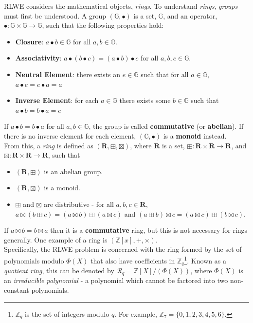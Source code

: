 RLWE considers the mathematical objects, \textit{rings}. To understand \textit{rings}, \textit{groups} must first be understood. A group $(\mathbb{G}, \bullet)$ is a set, $\mathbb{G}$, and an operator, $\bullet: \mathbb{G} \times \mathbb{G} \rightarrow \mathbb{G}$, such that the following properties hold:
\begin{itemize}
    \item \textbf{Closure}: $a \bullet b \in \mathbb{G}$ for all $a,b \in \mathbb{G}$.
    \item \textbf{Associativity}: $a \bullet (b \bullet c) = (a \bullet b) \bullet c$ for all $a, b, c \in \mathbb{G}$.
    \item \textbf{Neutral Element}: there exists an $e \in \mathbb{G}$ such that for all $a \in \mathbb{G}$, $a \bullet e = e \bullet a = a$
    \item \textbf{Inverse Element}: for each $a \in \mathbb{G}$ there exists some $b \in \mathbb{G}$ such that $a \bullet b = b \bullet a = e$
\end{itemize}
If $a \bullet b = b \bullet a$ for all $a, b \in \mathbb{G}$, the group is called \textbf{commutative} (or \textbf{abelian}). If there is no inverse element for each element, $(\mathbb{G}, \bullet)$ is a \textbf{monoid} instead.
\smallskip \\ \indent
From this, a \textit{ring} is defined as $(\textbf{R}, \boxplus, \boxtimes)$, where $\textbf{R}$ is a set, $\boxplus: \textbf{R} \times \textbf{R} \rightarrow \textbf{R}$, and $\boxtimes: \textbf{R} \times \textbf{R} \rightarrow \textbf{R}$, such that
\begin{itemize}
    \item $(\textbf{R}, \boxplus)$ is an abelian group.
    \item $(\textbf{R}, \boxtimes)$ is a monoid.
    \item $\boxplus$ and $\boxtimes$ are distributive - for all $a, b, c \in \textbf{R}$, $a \boxtimes (b \boxplus c) = (a \boxtimes b) \boxplus (a \boxtimes c)$ and $(a \boxplus b) \boxtimes c = (a \boxtimes c) \boxplus (b \boxtimes c)$.
\end{itemize}
If $a \boxtimes b = b \boxtimes a$ then it is a \textbf{commutative} ring, but this is not necessary for rings generally. One example of a ring is $(\mathbb{Z}[x], +, \times)$.
\smallskip \\ \indent
Specifically, the RLWE problem is concerned with the ring formed by the set of polynomials modulo $\Phi (X)$ that also have coefficients in $\mathbb{Z}_q$\footnote{$\mathbb{Z}_q$ is the set of integers modulo $q$. For example, $\mathbb{Z}_7 = \{0, 1, 2, 3, 4, 5, 6\}$.}. Known as a \textit{quotient ring}, this can be denoted by $\mathcal{R}_q = \mathbb{Z}[X] / (\Phi(X))$, where $\Phi(X)$ is an \textit{irreducible polynomial} - a polynomial which cannot be factored into two non-constant polynomials.
